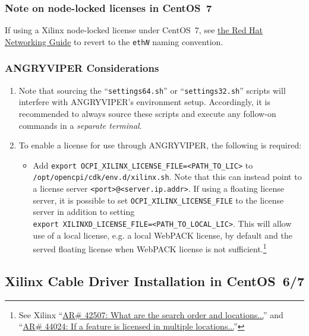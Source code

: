 \subsubsection{Note on node-locked licenses in CentOS~7}
If using a Xilinx node-locked license under CentOS~7, see \href{https://access.redhat.com/documentation/en-US/Red_Hat_Enterprise_Linux/7/html/Networking_Guide/sec-Disabling_Consistent_Network_Device_Naming.html}{the Red Hat Networking Guide} to revert to the
\texttt{eth\textit{N}} naming convention.

\subsubsection{ANGRYVIPER Considerations}
\begin{enumerate}
\item Note that sourcing the ``\verb+settings64.sh+'' or ``\verb+settings32.sh+'' scripts will interfere with ANGRYVIPER's environment setup. Accordingly, it is recommended to always source these scripts and execute any follow-on commands in a \textit{separate terminal}.
\item To enable a license for use through ANGRYVIPER, the following is required:

	\begin{itemize}
		\item Add \verb+export OCPI_XILINX_LICENSE_FILE=<PATH_TO_LIC>+ to \verb+/opt/opencpi/cdk/env.d/xilinx.sh+. Note that this can instead point to a license server \verb+<port>@<server.ip.addr>+. If using a floating license server, it is possible to set \verb+OCPI_XILINX_LICENSE_FILE+ to the license server in addition to setting \\\verb+export XILINXD_LICENSE_FILE=<PATH_TO_LOCAL_LIC>+. This will allow use of a local license, e.g. a local WebPACK license, by default and the served floating license when WebPACK license is not sufficient.\footnote{See Xilinx ``\href{https://www.xilinx.com/support/answers/42507.html}{AR\# 42507: What are the search order and locations...}'' and ``\href{https://www.xilinx.com/support/answers/44024.html}{AR\# 44024: If a feature is licensed in multiple locations...}''}
	\end{itemize}
\end{enumerate}

\subsection{Xilinx Cable Driver Installation in CentOS~6/7}
\label{sec:cable}
